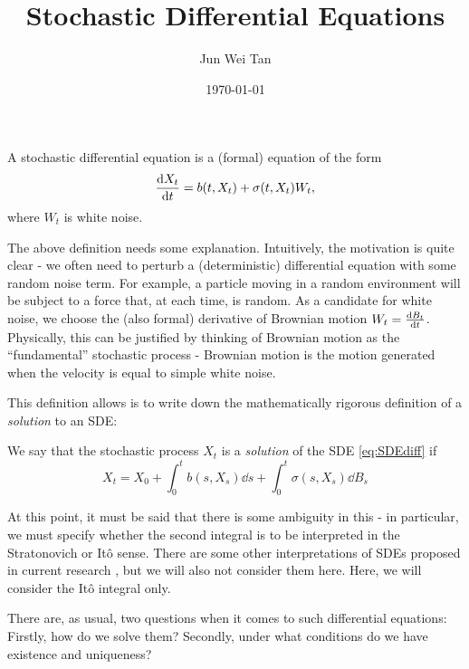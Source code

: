 \documentclass[prb,12pt]{revtex4-2}
\theoremstyle{definition}
\theoremstyle{definition}
\theoremstyle{definition}
\begin{document}
	\title{Stochastic Differential Equations}
	\author{Jun Wei Tan}
	\date{\today}
	\maketitle

\begin{Definition}
	A stochastic differential equation is a (formal) equation of the form
	\begin{equation}\label{eq:SDEdiff}
	\dv{X_t}{t}=b(t, X_t)+\sigma(t, X_t)W_t,
\end{equation}
	where $W_t$ is white noise. 
\end{Definition}
The above definition needs some explanation. Intuitively, the motivation is quite clear - we often need to perturb a (deterministic) differential equation with some random noise term. For example, a particle moving in a random environment will be subject to a force that, at each time, is random. As a candidate for white noise, we choose the (also formal) derivative of Brownian motion $W_t = \dv{B_t}{t}$. Physically, this can be justified by thinking of Brownian motion as the ``fundamental'' stochastic process - Brownian motion is the motion generated when the velocity is equal to simple white noise. 

This definition allows is to write down the mathematically rigorous definition of a \emph{solution} to an SDE:
\begin{Definition}
	We say that the stochastic process $X_t$ is a \emph{solution} of the SDE \eqref{eq:SDEdiff} if
	\[X_t = X_0+\int_0^t b(s, X_s)\dd{s}+ \int_0^t \sigma(s, X_s)\dd{B_s}\]
\end{Definition}
At this point, it must be said that there is some ambiguity in this - in particular, we must specify whether the second integral is to be interpreted in the Stratonovich or Itô sense. There are some other interpretations of SDEs proposed in current research \cite{Shi_2012}, but we will also not consider them here. Here, we will consider the Itô integral only.

There are, as usual, two questions when it comes to such differential equations: Firstly, how do we solve them? Secondly, under what conditions do we have existence and uniqueness?
\end{document}
